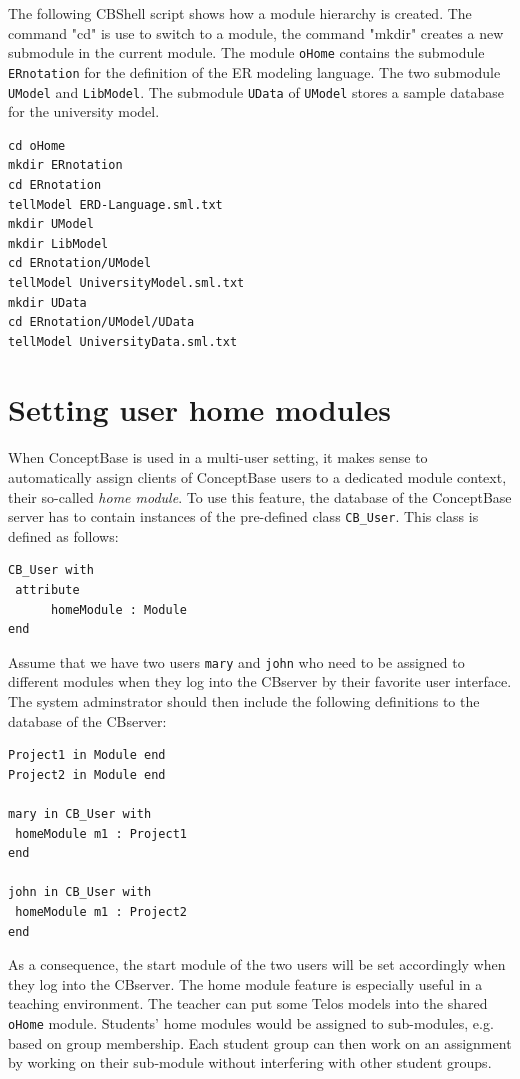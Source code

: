 The following CBShell script shows how a module hierarchy is created.
The command "cd" is use to switch to a module, the command "mkdir" creates a new submodule
in the current module. The module {\tt oHome}
contains the submodule {\tt ERnotation} for the definition of the ER modeling language.
The two submodule {\tt UModel} and {\tt LibModel}. The submodule {\tt UData} of
{\tt UModel} stores a sample database for the university model.

\begin{verbatim}
cd oHome
mkdir ERnotation
cd ERnotation
tellModel ERD-Language.sml.txt
mkdir UModel
mkdir LibModel
cd ERnotation/UModel
tellModel UniversityModel.sml.txt
mkdir UData
cd ERnotation/UModel/UData
tellModel UniversityData.sml.txt
\end{verbatim}




\section{Setting user home modules} \label{sec:homemodule}

When ConceptBase is used in a multi-user setting, it makes sense to
automatically assign clients of ConceptBase users to a dedicated
module context, their so-called {\em home module}.
To use this feature, the database of the ConceptBase server has to contain
instances of the pre-defined class {\tt CB\_User}. This class is defined as follows:

\begin{verbatim}
CB_User with
 attribute
      homeModule : Module
end
\end{verbatim}

Assume that we have two users {\tt mary}  and {\tt john} who need to
be assigned to different modules when they log into the CBserver by
their favorite user interface.
The system adminstrator should then include the following definitions
to the database of the CBserver:

\begin{verbatim}
Project1 in Module end
Project2 in Module end

mary in CB_User with
 homeModule m1 : Project1
end

john in CB_User with
 homeModule m1 : Project2
end
\end{verbatim}

As a consequence, the start module of the two users will be set accordingly when
they log into the CBserver. The home module feature is especially useful
in a teaching environment. The teacher can put some Telos models into
the shared {\tt oHome} module. Students' home modules would be assigned to sub-modules,
e.g. based on group membership. Each student group can then work on an assignment
by working on their sub-module without interfering with other student groups.

